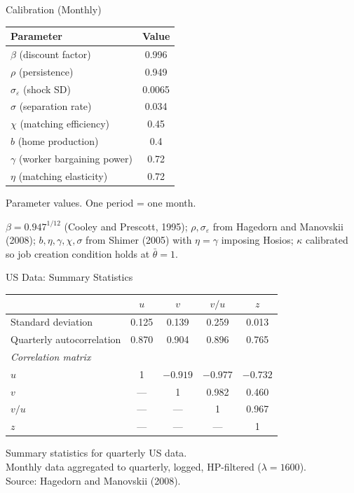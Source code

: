 \documentclass[blue]{beamer}
\begin{document}
\begin{frame}{Calibration (Monthly)}
	\begin{table}
		\centering
		\begin{tabular}{lc}
			\toprule
			Parameter & Value \\
			\midrule
			$\beta$ (discount factor) & 0.996 \\
			$\rho$ (persistence) & 0.949 \\
			$\sigma_\varepsilon$ (shock SD) & 0.0065 \\
			$\sigma$ (separation rate) & 0.034 \\
			$\chi$ (matching efficiency) & 0.45 \\
			$b$ (home production) & 0.4 \\
			$\gamma$ (worker bargaining power) & 0.72 \\
			$\eta$ (matching elasticity) & 0.72 \\
			\bottomrule
		\end{tabular}
		
		{Parameter values. One period = one month.}
	\end{table}
	
	\small
	$\beta = 0.947^{1/12}$ (Cooley and Prescott, 1995); $\rho, \sigma_\varepsilon$ from Hagedorn and Manovskii (2008); $b, \eta, \gamma, \chi, \sigma$ from Shimer (2005) with $\eta = \gamma$ imposing Hosios; $\kappa$ calibrated so job creation condition holds at $\bar\theta = 1$.
\end{frame}

\begin{frame}{US Data: Summary Statistics}
	\begin{table}
		\centering
		\small
		\begin{tabular}{lcccc}
			\toprule
			& $u$ & $v$ & $v/u$ & $z$ \\
			\midrule
			Standard deviation & 0.125 & 0.139 & 0.259 & 0.013 \\
			Quarterly autocorrelation & 0.870 & 0.904 & 0.896 & 0.765 \\
			\midrule
			\multicolumn{5}{l}{\textit{Correlation matrix}} \\
			$u$ & 1 & $-0.919$ & $-0.977$ & $-0.732$ \\
			$v$ & --- & 1 & 0.982 & 0.460 \\
			$v/u$ & --- & --- & 1 & 0.967 \\
			$z$ & --- & --- & --- & 1 \\
			\bottomrule
		\end{tabular}
		
		 Summary statistics for quarterly US data.\\ Monthly data aggregated to quarterly, logged, HP-filtered ($\lambda = 1600$).\\ Source: Hagedorn and Manovskii (2008).
	\end{table}
\end{frame}
\end{document}
